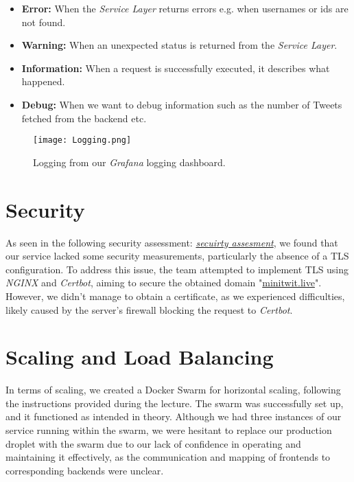 \begin{itemize}
    \item \textbf{Error:} When the \textit{Service Layer} returns errors e.g. when usernames or ids are not found.
    \item \textbf{Warning:} When an unexpected status is returned from the \textit{Service Layer}.
    \item \textbf{Information:} When a request is successfully executed, it describes what happened.
    \item \textbf{Debug:} When we want to debug information such as the number of Tweets fetched from the backend etc.
\end{itemize}

\begin{sidewaysfigure}[H]
    \centering
    \texttt{[image: Logging.png]}
    \caption{Logging from our \textit{Grafana} logging dashboard.}
    \label{fig:Minitwit_logging}
\end{sidewaysfigure}

\section{Security}

As seen in the following security assessment: \href{https://github.com/simonskodt/itu-minitwit/blob/main/Documents/SECURITY_ASSESSMENT.md}{\textit{secuirty assesment}}, we found that our service lacked some security measurements, particularly the absence of a TLS configuration. To address this issue, the team attempted to implement TLS using \textit{NGINX} and \textit{Certbot}, aiming to secure the obtained domain "\underline{minitwit.live}". However, we didn't manage to obtain a certificate, as we experienced difficulties, likely caused by the server's firewall blocking the request to \textit{Certbot}.

\section{Scaling and Load Balancing}

In terms of scaling, we created a Docker Swarm for horizontal scaling, following the instructions provided during the lecture.  The swarm was successfully set up, and it functioned as intended in theory. Although we had three instances of our service running within the swarm, we were hesitant to replace our production droplet with the swarm due to our lack of confidence in operating and maintaining it effectively, as the communication and mapping of frontends to corresponding backends were unclear.

